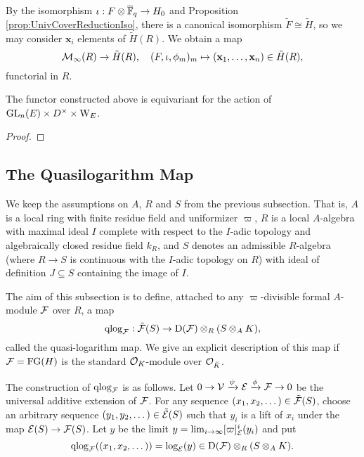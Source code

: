 \documentclass[../main.tex]{subfiles}
\begin{document}
By the isomorphism $\iota: F \otimes {\overline{\mathbb{F}}_q} \to H_0$ and Proposition
\ref{prop:UnivCoverReductionIso}, there is a canonical
isomorphism $\tilde F \cong \tilde H$, so we may consider
$\mathbf x_i$ elements of $\tilde H(R)$. We obtain a map
\begin{equation*}
  \mathcal{M}_\infty(R) \to \tilde H(R), \quad (F, \iota, \phi_m)_m \mapsto 
  (\mathbf x_1, \dots, \mathbf x_n) \in \tilde H(R),
\end{equation*}
functorial in $R$.
\begin{lem}\label{lem:EquivarianceOfMap}
  The functor constructed above is equivariant for the action of 
  $\operatorname{GL}_n(E) \times D^\times \times \mathrm W_E$. 
\begin{proof}
\end{proof}
\end{lem}



\subsection{The Quasilogarithm Map} %
\label{sub:The Quasilogarithm map}
We keep the assumptions on $A$, $R$ and $S$ from the previous subsection. That is,
$A$ is a local ring with finite residue field and uniformizer $\varpi$, 
$R$ is a local $A$-algebra with maximal ideal $I$ complete with respect to
the $I$-adic topology and algebraically closed residue field $k_R$, and 
$S$ denotes an admissible $R$-algebra (where $R \to S$ is continuous with
the $I$-adic topology on $R$) with ideal of definition $J \subseteq S$ containing
the image of $I$. 

The aim of this subsection is to define, attached to any $\varpi$-divisible formal
$A$-module $\mathcal{F}$ over $R$, a map
\begin{equation*}
\mathrm{qlog}_{\mathcal{F}}: \tilde {\mathcal{F}}(S) \to \mathrm{D}(\mathcal{F}) \otimes_R (S \otimes_A K),
\end{equation*}
called the quasi-logarithm map.
We give an explicit description of this map if $\mathcal{F} = \textnormal{FG}(H)$ is the standard
$\mathcal{O}_K$-module over $\mathcal{O}_{\breve K}$. 

The construction of $\mathrm{qlog}_{\mathcal{F}}$ is as follows.  
Let $0 \to \mathcal{V} \xrightarrow{\psi} \mathcal{E} \xrightarrow{\phi} \mathcal{F} \to 0$ be the universal additive
extension of $\mathcal{F}$. For any sequence $(x_1, x_2, \dots) \in \tilde {\mathcal{F}}(S)$, choose an arbitrary sequence $(y_1, y_2, \dots) \in
\tilde {\mathcal{E}}(S)$ such that $y_i$ is a lift of $x_i$ under the map $\mathcal{E}(S) \to \mathcal{F}(S)$. 
Let $y$ be the limit $y = \lim_{i \to \infty} [\varpi]_{\mathcal{E}}^i(y_i)$ and put 
$$\mathrm{qlog}_{\mathcal{F}}((x_1, x_2, \dots)) = \log_{\mathcal{E}}(y) \in \mathrm{D}(\mathcal{F}) \otimes_R(S \otimes_A K).$$ 
\end{document}
